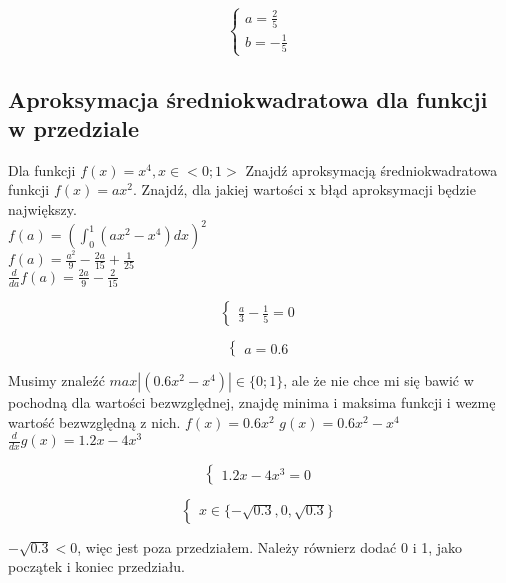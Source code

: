 \documentclass{article}
\begin{document}
\begin{equation*}\begin{cases}
    a=\frac{2}{5}\\
    b=-\frac{1}{5}
\end{cases}\end{equation*}

\subsection{Aproksymacja średniokwadratowa dla funkcji w przedziale}
Dla funkcji $f(x)=x^4, x\in<0; 1>$ Znajdź aproksymacją średniokwadratowa funkcji $f(x)=ax^2$. Znajdź, dla jakiej wartości x błąd aproksymacji będzie największy.\\
$f(a) = (\int_{0}^{1}(ax^2-x^4)dx)^2$\\
$f(a) = \frac{a^2}{9}-\frac{2a}{15}+\frac{1}{25}$\\
$\frac{d}{da}f(a) = \frac{2a}{9}-\frac{2}{15}$

\begin{equation*}\begin{cases}
    \frac{a}{3}-\frac{1}{5} = 0
\end{cases}\end{equation*}

\begin{equation*}\begin{cases}
    a = 0.6
\end{cases}\end{equation*}

Musimy znaleźć $max|(0.6x^2-x^4)|\in\{0; 1\}$, ale że nie chce mi się bawić w pochodną dla wartości bezwzględnej, znajdę minima i maksima funkcji i wezmę wartość bezwzględną z nich.
$f(x) = 0.6x^2$
$g(x) = 0.6x^2-x^4$
$\frac{d}{dx}g(x) = 1.2x-4x^3$

\begin{equation*}\begin{cases}
    1.2x-4x^3 = 0
\end{cases}\end{equation*}

\begin{equation*}\begin{cases}
    x \in \{-\sqrt{0.3}, 0, \sqrt{0.3}\}
\end{cases}\end{equation*}

$-\sqrt{0.3}<0$, więc jest poza przedziałem. Należy równierz dodać 0 i 1, jako początek i koniec przedziału.
\end{document}
